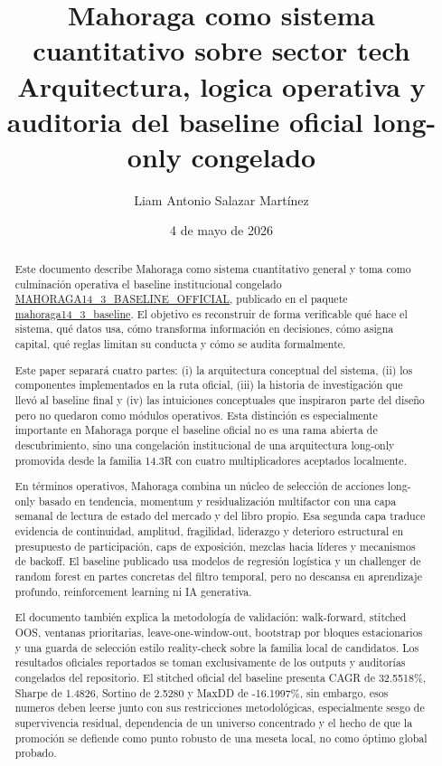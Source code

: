 \documentclass[11pt,letterpaper]{article}
\title{\textbf{Mahoraga como sistema cuantitativo sobre sector tech}\\
\large Arquitectura, logica operativa y auditoria del baseline oficial long-only congelado}
\author{Liam Antonio Salazar Martínez}
\date{4 de mayo de 2026}
\newcommand{\code}[1]{{\urlstyle{tt}\url{#1}}}
\newcommand{\baselinepkg}{\code{mahoraga14_3_baseline}}
\newcommand{\officiallabel}{\code{MAHORAGA14_3_BASELINE_OFFICIAL}}
\begin{document}
\maketitle
\tableofcontents
\clearpage

\begin{abstract}
Este documento describe Mahoraga como sistema cuantitativo general y toma como culminación operativa el baseline institucional congelado \officiallabel, publicado en el paquete \baselinepkg. El objetivo es reconstruir de forma verificable qué hace el sistema, qué datos usa, cómo transforma información en decisiones, cómo asigna capital, qué reglas limitan su conducta y cómo se audita formalmente.

Este paper separará cuatro partes: (i) la arquitectura conceptual del sistema, (ii) los componentes implementados en la ruta oficial, (iii) la historia de investigación que llevó al baseline final y (iv) las intuiciones conceptuales que inspiraron parte del diseño pero no quedaron como módulos operativos. Esta distinción es especialmente importante en Mahoraga porque el baseline oficial no es una rama abierta de descubrimiento, sino una congelación institucional de una arquitectura long-only promovida desde la familia 14.3R con cuatro multiplicadores aceptados localmente.

En términos operativos, Mahoraga combina un núcleo de selección de acciones long-only basado en tendencia, momentum y residualización multifactor con una capa semanal de lectura de estado del mercado y del libro propio. Esa segunda capa traduce evidencia de continuidad, amplitud, fragilidad, liderazgo y deterioro estructural en presupuesto de participación, caps de exposición, mezclas hacia líderes y mecanismos de backoff. El baseline publicado usa modelos de regresión logística y un challenger de random forest en partes concretas del filtro temporal, pero no descansa en aprendizaje profundo, reinforcement learning ni IA generativa.

El documento también explica la metodología de validación: walk-forward, stitched OOS, ventanas prioritarias, leave-one-window-out, bootstrap por bloques estacionarios y una guarda de selección estilo reality-check sobre la familia local de candidatos. Los resultados oficiales reportados se toman exclusivamente de los outputs y auditorías congelados del repositorio. El stitched oficial del baseline presenta CAGR de 32.5518\%, Sharpe de 1.4826, Sortino de 2.5280 y MaxDD de -16.1997\%, sin embargo, esos numeros deben leerse junto con sus restricciones metodológicas, especialmente sesgo de supervivencia residual, dependencia de un universo concentrado y el hecho de que la promoción se defiende como punto robusto de una meseta local, no como óptimo global probado.
\end{abstract}
\end{document}
